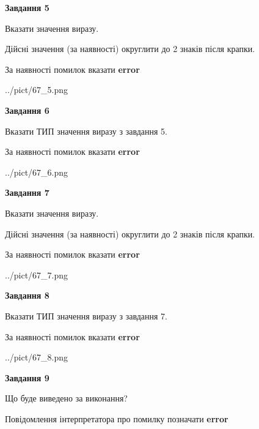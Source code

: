 \documentclass[11pt, ukrainian]{article}
\begin{document}
{\begin {large}
{\begin {center}\textbf{Завдання 5}\end {center}}\par
Вказати значення виразу. \par
Дійсні значення (за наявності) округлити до 2 знаків після крапки. \par
За наявності помилок вказати \textbf{error}

\begin{center}
	{../pict/67_5.png}
\end{center}
\newpage

{\begin {center}\textbf{Завдання 6}\end {center}}\par
Вказати ТИП значення виразу з завдання 5. \par
За наявності помилок вказати \textbf{error}

\begin{center}
	{../pict/67_6.png}
\end{center}
\newpage

{\begin {center}\textbf{Завдання 7}\end {center}}\par
Вказати значення виразу. \par
Дійсні значення (за наявності) округлити до 2 знаків після крапки. \par
За наявності помилок вказати \textbf{error}

\begin{center}
	{../pict/67_7.png}
\end{center}
\newpage

{\begin {center}\textbf{Завдання 8}\end {center}}\par
Вказати ТИП значення виразу з завдання 7. \par
За наявності помилок вказати \textbf{error}

\begin{center}
	{../pict/67_8.png}
\end{center}
\newpage

{\begin {center}\textbf{Завдання 9}\end {center}}\par
Що буде виведено за виконання? \par
Повідомлення інтерпретатора про помилку позначати \textbf{error}


\end{large}}
\end{document}
